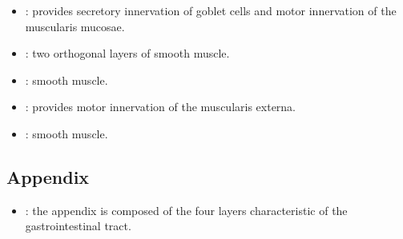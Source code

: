 \begin{itemize}
\begin{multicols}{2}
\begin{itemize}
    \item {}: provides secretory innervation of goblet cells and motor innervation of the muscularis mucosae.
    
    \begin{center}
    \end{center}
    
    \item {}: two orthogonal layers of smooth muscle. 
    
    \begin{center}
    \end{center}
    
    \item {}: smooth muscle.
    
    \vspace{20pt}

    \begin{center}
    \end{center}

    \item {}: provides motor innervation of the muscularis externa.
    
    \begin{center}
    \end{center}
    
    \item {}: smooth muscle.
    
    \begin{center}
    \end{center}
    
  \end{itemize}
  \end{multicols}
  
  \subsection{Appendix}\label{Appendix}
  \begin{itemize}
    \item {}: the appendix is composed of the four layers characteristic of the gastrointestinal tract.
    

\end{itemize}
\end{itemize}
